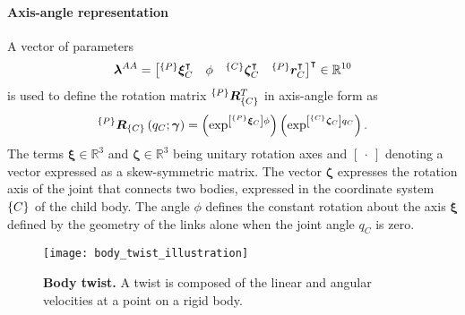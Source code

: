 \paragraph*{Axis-angle representation} A vector of parameters
\begin{equation}\label{eq:kinematic_parameters}
	\bm{\lambda}^{AA} = \begin{bmatrix}
		^{\left\lbrace P \right\rbrace}\bm{\xi}_{C}^\intercal & \phi & ^{\left\lbrace C \right\rbrace}\bm{\zeta}_{C}^\intercal & ^{\left\lbrace P \right\rbrace}\bm{r}^\intercal_C 
	\end{bmatrix}^\intercal \in \mathbb{R}^{10}
\end{equation}
is used to define the rotation matrix $^{\left\lbrace P \right\rbrace}\bm{R}^T_{\left\lbrace C \right\rbrace}$ in axis-angle form  as
\begin{equation}\label{eq:rotation_matrix_axis_angle}
	^{\left\lbrace P \right\rbrace}\bm{R}_{\left\lbrace C \right\rbrace}\left(q_{C};\bm{\gamma}\right) = \left(\exp^{\left[{^{\left\lbrace P\right\rbrace}}\bm{\xi}_{C}\right]\phi}\right) \left(\exp^{\left[{^{\left\lbrace C\right\rbrace}}\bm{\zeta}_{C}\right] q_C}	\right).
\end{equation}
The terms $ \bm{\xi} \in \mathbb{R}^3$ and $ \bm{\zeta} \in \mathbb{R}^3$ being unitary rotation axes and  $ \left[~\cdot~\right] $ denoting a vector expressed as a skew-symmetric matrix. The vector $ \bm{\zeta}$ expresses the rotation axis of the joint that connects two bodies, expressed in the coordinate system ${\left\lbrace C \right\rbrace}$ of the child body. The angle $\phi$ defines the constant rotation about the axis $\bm{\xi}$ defined by the geometry of the links alone when the joint angle $q_C$ is zero.

\begin{figure}
	\begin{center}
		\texttt{[image: body\_twist\_illustration]}
		\caption{\textbf{Body twist.} A twist is composed of the linear and angular velocities at a point on a rigid body.}
		\label{fig:body_twist_illustration}
	\end{center}
\end{figure}






